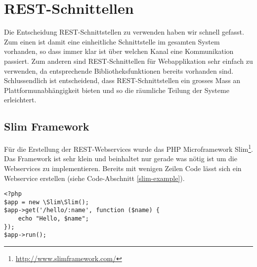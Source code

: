 \section{REST-Schnittellen}
Die Entscheidung \gls{REST}-Schnittstellen zu verwenden haben wir schnell gefasst. 
Zum einen ist damit eine einheitliche Schnittstelle im gesamten System vorhanden, so dass immer klar ist über welchen Kanal eine Kommunikation passiert.
Zum anderen sind \gls{REST}-Schnittellen für Webapplikation sehr einfach zu verwenden, da entsprechende Bibliotheksfunktionen bereits vorhanden sind.
Schlussendlich ist entscheidend, dass \gls{REST}-Schnittstellen ein grosses Mass an Plattformunabhängigkeit bieten und so die räumliche Teilung der Systeme erleichtert.

\subsection{Slim Framework}
Für die Erstellung der REST-Webservices wurde das PHP Microframework Slim\footnote{\url{http://www.slimframework.com/}}.
Das Framework ist sehr klein und beinhaltet nur gerade was nötig ist um die Webservices zu implementieren.
Bereits mit wenigen Zeilen Code lässt sich ein Webservice erstellen (siehe Code-Abschnitt \ref{slim-example}).

\lstset{language=PHP}
\begin{lstlisting}[float, caption=Beispiel REST-Webservice in Slim, label=slim-example]
<?php
$app = new \Slim\Slim();
$app->get('/hello/:name', function ($name) {
    echo "Hello, $name";
});
$app->run();
\end{lstlisting}














